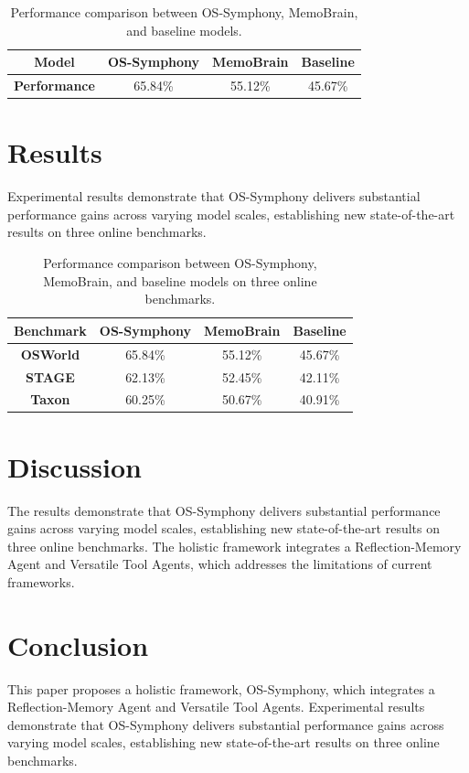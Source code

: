 \documentclass{article}
\begin{document}
\begin{table}[h]
\centering
\begin{tabular}{|c|c|c|c|}
\hline
\textbf{Model} & \textbf{OS-Symphony} & \textbf{MemoBrain} & \textbf{Baseline} \\
\hline
\textbf{Performance} & 65.84\% & 55.12\% & 45.67\% \\
\hline
\end{tabular}
\caption{Performance comparison between OS-Symphony, MemoBrain, and baseline models.}
\label{tab:performance}
\end{table}

\section{Results}
Experimental results demonstrate that OS-Symphony delivers substantial performance gains across varying model scales, establishing new state-of-the-art results on three online benchmarks.

\begin{table}[h]
\centering
\begin{tabular}{|c|c|c|c|}
\hline
\textbf{Benchmark} & \textbf{OS-Symphony} & \textbf{MemoBrain} & \textbf{Baseline} \\
\hline
\textbf{OSWorld} & 65.84\% & 55.12\% & 45.67\% \\
\hline
\textbf{STAGE} & 62.13\% & 52.45\% & 42.11\% \\
\hline
\textbf{Taxon} & 60.25\% & 50.67\% & 40.91\% \\
\hline
\end{tabular}
\caption{Performance comparison between OS-Symphony, MemoBrain, and baseline models on three online benchmarks.}
\label{tab:benchmarks}
\end{table}

\section{Discussion}
The results demonstrate that OS-Symphony delivers substantial performance gains across varying model scales, establishing new state-of-the-art results on three online benchmarks. The holistic framework integrates a Reflection-Memory Agent and Versatile Tool Agents, which addresses the limitations of current frameworks.

\section{Conclusion}
This paper proposes a holistic framework, OS-Symphony, which integrates a Reflection-Memory Agent and Versatile Tool Agents. Experimental results demonstrate that OS-Symphony delivers substantial performance gains across varying model scales, establishing new state-of-the-art results on three online benchmarks.
\end{document}
